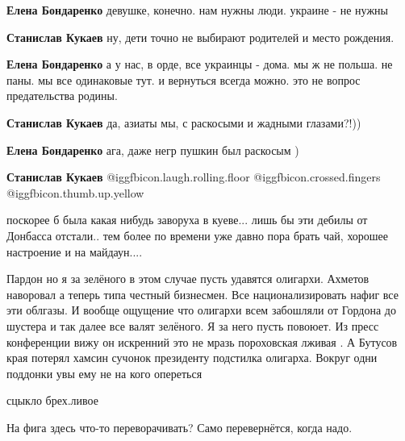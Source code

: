 \begin{itemize}
\begin{itemize}
\textbf{Елена Бондаренко} девушке, конечно.
нам нужны люди. украине - не нужны

\textbf{Станислав Кукаев} ну, дети точно не выбирают родителей и место рождения.

\textbf{Елена Бондаренко} а у нас, в орде, все украинцы - дома.
мы ж не польша. не паны. мы все одинаковые тут.
и вернуться всегда можно.
это не вопрос предательства родины.

\textbf{Станислав Кукаев} да, азиаты мы, с раскосыми и жадными глазами?!))

\textbf{Елена Бондаренко} ага, даже негр пушкин был раскосым )

\textbf{Станислав Кукаев}  @igg{fbicon.laugh.rolling.floor}  @igg{fbicon.crossed.fingers}  @igg{fbicon.thumb.up.yellow} 

\end{itemize} %


поскорее б была какая нибудь заворуха в куеве... лишь бы эти дебилы от Донбасса
отстали.. тем более по времени уже давно пора брать чай, хорошее настроение и
на майдаун....


Пардон но я за зелёного в этом случае пусть удавятся олигархи. Ахметов
наворовал а теперь типа честный бизнесмен. Все национализировать нафиг все эти
облгазы. И вообще ощущение что олигархи всем забошляли от Гордона до шустера и
так далее все валят зелёного. Я за него пусть повоюет. Из пресс конференции
вижу он искренний это не мразь пороховская лживая . А Бутусов края потерял
хамсин сучонок президенту подстилка олигарха. Вокруг одни поддонки увы ему не
на кого опереться

сцыкло брех.ливое

На фига здесь что-то переворачивать? Само перевернётся, когда надо.

\end{itemize} %
